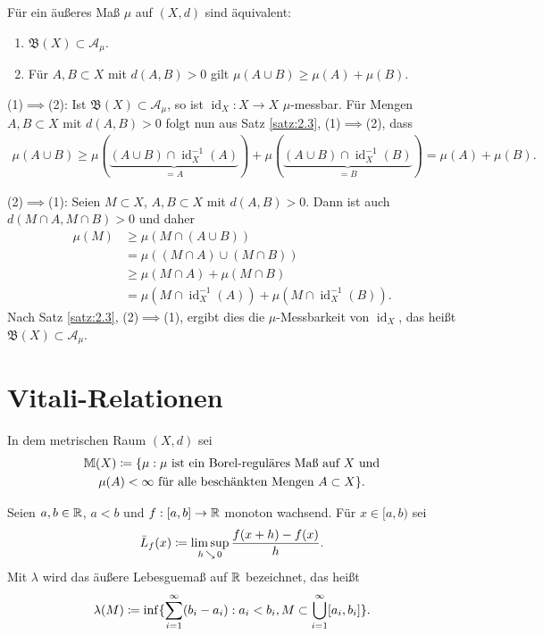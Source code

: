 \documentclass[a4paper,twoside,DIV15,BCOR12mm]{scrbook}
\newcommand{\A}{\mathcal A}
\newcommand{\borel}{\mathfrak B}
\DeclareMathOperator{\id}{id}
\DeclareMathOperator{\downto}{\searrow}
\begin{document}
\begin{satz}
\label{satz:2.4}
Für ein äußeres Maß $\mu$ auf $(X,d)$ sind äquivalent:
\begin{enumerate}
\item $\borel(X) \subset \A_\mu$.
\item Für $A,B\subset X$ mit $d(A,B)>0$ gilt $\mu(A\cup B) \ge \mu(A) + \mu(B)$.
\end{enumerate}
\end{satz}

\begin{beweis}
(1)$\implies$(2): Ist $\borel(X)\subset \A_\mu$, so ist $\id_X: X\to X$ $\mu$-messbar. Für Mengen $A,B\subset X$ mit $d(A,B)>0$ folgt nun aus Satz \ref{satz:2.3}, (1)$\implies$(2), dass 
\begin{align*}
\mu(A\cup B) \ge \mu( \underbrace{(A\cup B) \cap \id_X^{-1}(A)}_{=A} ) + \mu( \underbrace{(A\cup B) \cap \id_X^{-1}(B)}_{=B}) = \mu(A) + \mu(B).
\end{align*}

(2)$\implies$(1): Seien $M\subset X$, $A,B\subset X$ mit $d(A,B)>0$. Dann ist auch $d(M\cap A, M\cap B)>0$ und daher
\begin{align*}
\mu(M)
&\ge \mu( M\cap (A\cup B) )\\
&= \mu( (M\cap A)\cup (M\cap B) )\\
&\ge \mu(M\cap A) + \mu(M\cap B)\\
&= \mu(M \cap \id_X^{-1}(A)) + \mu(M \cap \id_X^{-1}(B)).
\end{align*}
Nach Satz \ref{satz:2.3}, (2)$\implies$(1), ergibt dies die $\mu$-Messbarkeit von $\id_X$, das heißt $\borel(X)\subset \A_\mu$.
\end{beweis}

\section{Vitali-Relationen}

In dem metrischen Raum $(X,d)$ sei 
\begin{multline*}
\mathbb M(X) \da \{\mu: \text{$\mu$ ist ein Borel-reguläres Maß auf $X$ und}\\\text{$\mu(A)<\infty$ für alle beschänkten Mengen $A\subset X$}\}.
\end{multline*}

\begin{motivation}
Seien $a,b\in\mathbb{R}$, $a<b$ und $f:[a,b]\to \mathbb{R}$ monoton wachsend. Für $x\in[a,b)$ sei 
\[
\bar L_f(x) \da \limsup_{h\downto0} \frac{f(x+h) - f(x)}{h}.
\]
Mit $\lambda$ wird das äußere Lebesguemaß auf $\mathbb{R}$ bezeichnet, das heißt
\[
\lambda(M) \da\inf\{\sum_{i=1}^\infty (b_i-a_i): a_i < b_i, M\subset \bigcup_{i=1}^\infty [a_i, b_i]\}.
\]
\end{motivation}
\end{document}
